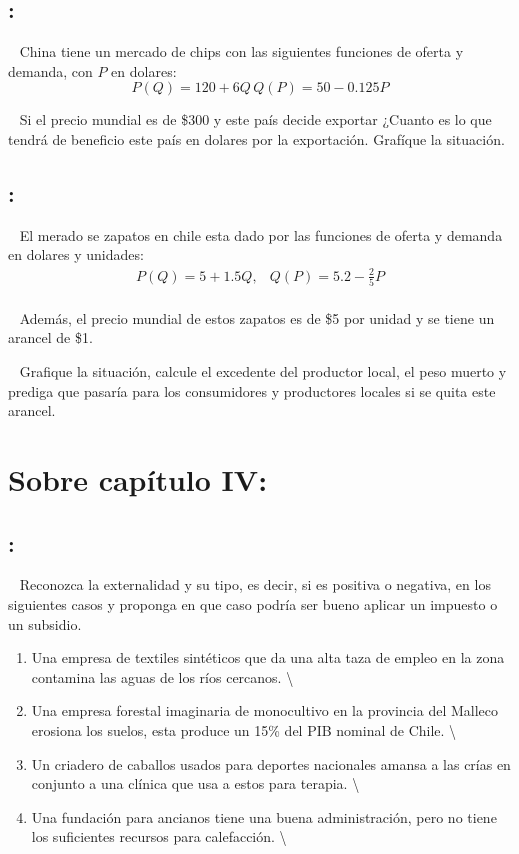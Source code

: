 \documentclass[
  letterpaper,
  DIV=11,
  numbers=noendperiod]{scrreport}
\providecommand{\tightlist}{%
  \setlength{\itemsep}{0pt}\setlength{\parskip}{0pt}}\usepackage{longtable,booktabs,array}
\begin{document}
\hypertarget{section-10}{%
\subsection{:}\label{section-10}}

~ China tiene un mercado de chips con las siguientes funciones de oferta
y demanda, con \(P\) en dolares: \[
P(Q)=120+6Q \, Q(P)=50-0.125P
\]

~ Si el precio mundial es de \$300 y este país decide exportar ¿Cuanto
es lo que tendrá de beneficio este país en dolares por la exportación.
Grafíque la situación.

\hypertarget{section-11}{%
\subsection{:}\label{section-11}}

~ El merado se zapatos en chile esta dado por las funciones de oferta y
demanda en dolares y unidades: \[
\begin{array}{cc}P(Q)=5+1.5Q, & Q(P)=5.2-\frac{2}{5}P\\\end{array}
\]

~ Además, el precio mundial de estos zapatos es de \$5 por unidad y se
tiene un arancel de \$1.

~ Grafique la situación, calcule el excedente del productor local, el
peso muerto y prediga que pasaría para los consumidores y productores
locales si se quita este arancel.

\hypertarget{sobre-capuxedtulo-iv}{%
\section{Sobre capítulo IV:}\label{sobre-capuxedtulo-iv}}

\hypertarget{section-12}{%
\subsection{:}\label{section-12}}

~ Reconozca la externalidad y su tipo, es decir, si es positiva o
negativa, en los siguientes casos y proponga en que caso podría ser
bueno aplicar un impuesto o un subsidio.

\begin{enumerate}
\def\labelenumi{\arabic{enumi})}
\tightlist
\item
  Una empresa de textiles sintéticos que da una alta taza de empleo en
  la zona contamina las aguas de los ríos cercanos. \textbackslash{}
\item
  Una empresa forestal imaginaria de monocultivo en la provincia del
  Malleco erosiona los suelos, esta produce un 15\% del PIB nominal de
  Chile. \textbackslash{}
\item
  Un criadero de caballos usados para deportes nacionales amansa a las
  crías en conjunto a una clínica que usa a estos para terapia.
  \textbackslash{}
\item
  Una fundación para ancianos tiene una buena administración, pero no
  tiene los suficientes recursos para calefacción. \textbackslash{}
\end{enumerate}
\end{document}
